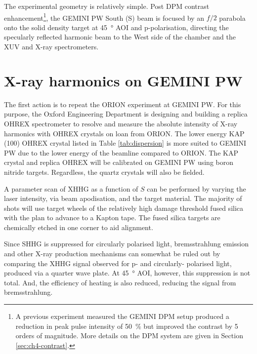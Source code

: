 
The experimental geometry is relatively simple. Post \ac{DPM} contrast enhancement\footnote{A previous experiment measured the GEMINI DPM setup produced a reduction in peak pulse intensity of \qty{50}{\%} but improved the contrast by 5 orders of magnitude. More details on the DPM system are given in Section \ref{sec:ch4-contrast}.}, the GEMINI PW South (S) beam is focused by an $f/2$ parabola onto the solid density target at \qty{45}{\degree} \ac{AOI} and p-polarisation, directing the specularly reflected harmonic beam to the West side of the chamber and the XUV and X-ray spectrometers.

\section{X-ray harmonics on GEMINI PW}\label{sec:ch4-xray}
The first action is to repeat the ORION experiment at GEMINI PW. For this purpose, the Oxford Engineering Department is designing and building a replica OHREX spectrometer to resolve and measure the absolute intensity of X-ray harmonics with OHREX crystals on loan from ORION. The lower energy KAP (100) OHREX crystal listed in Table \ref{tab:dispersion} is more suited to GEMINI PW due to the lower energy of the beamline compared to ORION. The KAP crystal and replica OHREX will be calibrated on GEMINI PW using boron nitride targets. Regardless, the quartz crystals will also be fielded. 

A parameter scan of \ac{XHHG} as a function of $S$ can be performed by varying the laser intensity, via beam apodisation, and the target material. The majority of shots will use target wheels of the relatively high damage threshold fused silica with the plan to advance to a Kapton tape. The fused silica targets are chemically etched in one corner to aid alignment.

Since SHHG is suppressed for circularly polarised light, bremsstrahlung emission and other X-ray production mechanisms can somewhat be ruled out by comparing the \ac{XHHG} signal observed for p- and circularly- polarised light, produced via a quarter wave plate. At \qty{45}{\degree} \ac{AOI}, however, this suppression is not total. And, the efficiency of heating is also reduced, reducing the signal from bremsstrahlung.

